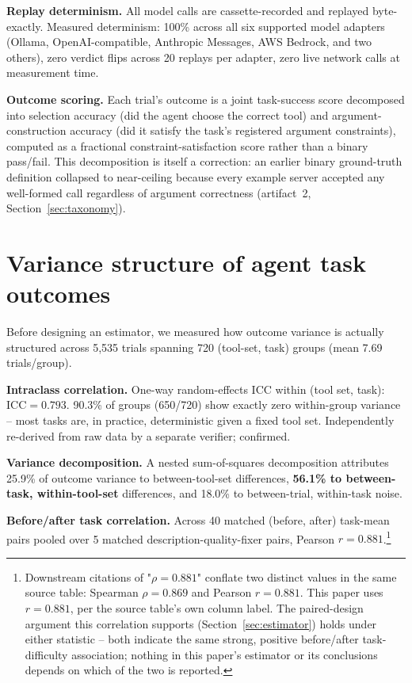 \documentclass[11pt]{article}
\begin{document}
\textbf{Replay determinism.} All model calls are cassette-recorded and replayed byte-exactly.
Measured determinism: 100\% across all six supported model adapters (Ollama, OpenAI-compatible,
Anthropic Messages, AWS Bedrock, and two others), zero verdict flips across 20 replays per adapter,
zero live network calls at measurement time.

\textbf{Outcome scoring.} Each trial's outcome is a joint task-success score decomposed into
selection accuracy (did the agent choose the correct tool) and argument-construction accuracy (did
it satisfy the task's registered argument constraints), computed as a fractional
constraint-satisfaction score rather than a binary pass/fail.
This decomposition is itself a correction: an earlier binary ground-truth definition collapsed to
near-ceiling because every example server accepted any well-formed call regardless of argument
correctness (artifact~2, Section~\ref{sec:taxonomy}).

\section{Variance structure of agent task outcomes}
\label{sec:variance}

Before designing an estimator, we measured how outcome variance is actually structured across
5,535 trials spanning 720 (tool-set, task) groups (mean 7.69 trials/group).

\textbf{Intraclass correlation.} One-way random-effects ICC \citep{shroutfleiss1979intraclass}
within (tool set, task):
$\mathrm{ICC}=0.793$. 90.3\% of groups (650/720) show exactly zero within-group variance -- most
tasks are, in practice, deterministic given a fixed tool set.
Independently re-derived from raw data by a separate verifier; confirmed.

\textbf{Variance decomposition.} A nested sum-of-squares decomposition attributes 25.9\% of
outcome variance to between-tool-set differences, \textbf{56.1\% to between-task, within-tool-set}
differences, and 18.0\% to between-trial, within-task noise.

\textbf{Before/after task correlation.} Across 40 matched (before, after) task-mean pairs pooled
over 5 matched description-quality-fixer pairs, Pearson $r=0.881$.\footnote{Downstream citations
of "$\rho=0.881$" conflate two distinct values in the same source table: Spearman
$\rho=0.869$ and Pearson $r=0.881$. This paper uses $r=0.881$, per the source table's own column
label. The paired-design argument this correlation supports (Section~\ref{sec:estimator}) holds
under either statistic -- both indicate the same strong, positive before/after task-difficulty
association; nothing in this paper's estimator or its conclusions depends on which of the two is
reported.}
\end{document}
